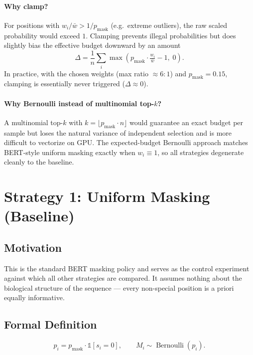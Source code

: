 \documentclass[11pt]{article}
\newcommand{\pmask}{p_{\text{mask}}}
\newcommand{\Ind}{\mathbb{1}}
\DeclareMathOperator{\Bern}{Bernoulli}
\begin{document}
\paragraph{Why clamp?} For positions with $w_i / \bar w > 1/\pmask$
(e.g.\ extreme outliers), the raw scaled probability would exceed $1$.
Clamping prevents illegal probabilities but does slightly bias the
effective budget downward by an amount
\[
\Delta = \frac{1}{n}\sum_i \max\!\left(\pmask \cdot \tfrac{w_i}{\bar w} - 1,\; 0\right).
\]
In practice, with the chosen weights (max ratio $\approx 6{:}1$) and
$\pmask = 0.15$, clamping is essentially never triggered ($\Delta \approx 0$).

\paragraph{Why Bernoulli instead of multinomial top-$k$?} A multinomial
top-$k$ with $k = \lfloor \pmask \cdot n \rfloor$ would guarantee an exact
budget per sample but loses the natural variance of independent selection
and is more difficult to vectorize on GPU. The expected-budget Bernoulli
approach matches BERT-style uniform masking exactly when $w_i \equiv 1$,
so all strategies degenerate cleanly to the baseline.

\section{Strategy 1: Uniform Masking (Baseline)}

\subsection{Motivation}
This is the standard BERT masking policy and serves as the control
experiment against which all other strategies are compared. It assumes
nothing about the biological structure of the sequence --- every
non-special position is a priori equally informative.

\subsection{Formal Definition}
\begin{equation}
p_i = \pmask \cdot \Ind[s_i = 0], \qquad
M_i \sim \Bern(p_i).
\end{equation}
\end{document}
